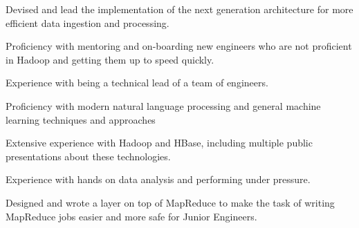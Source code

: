 \documentclass[margin,line,12pt]{resume}
\begin{document}
\begin{resume}
    \begin{list2}
    \item  Devised and lead the implementation of the next generation architecture for more efficient data ingestion and processing.
    \item  Proficiency with mentoring and on-boarding new engineers who are not proficient in Hadoop and getting them up to speed quickly.
    \item  Experience with being a technical lead of a team of engineers.
    \item  Proficiency with modern natural language processing and general machine learning techniques and approaches
    \item  Extensive experience with Hadoop and HBase, including multiple public presentations about these technologies.
    \item  Experience with hands on data analysis and performing under pressure.
    \item  Designed and wrote a layer on top of MapReduce to make the task of writing MapReduce jobs easier and more safe for Junior Engineers.
    \end{list2}

    \newpage
    \vspace*{1mm}




\end{resume}
\end{document}
